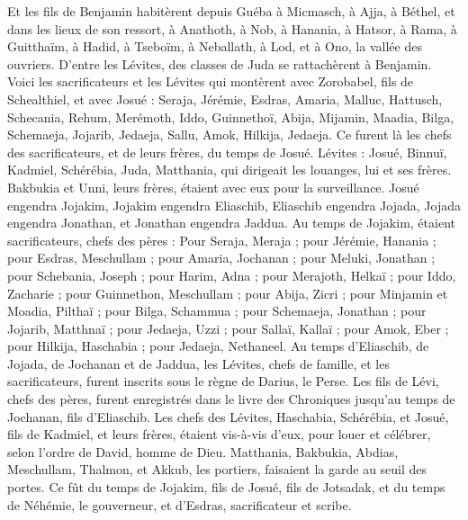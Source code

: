 \begin{multicols}{2}
Et les fils de Benjamin habitèrent depuis Guéba à Micmasch, à Ajja, à Béthel, et dans les lieux de son ressort,
à Anathoth, à Nob, à Hanania,
à Hatsor, à Rama, à Guitthaïm,
à Hadid, à Tseboïm, à Neballath,
à Lod, et à Ono, la vallée des ouvriers.
D'entre les Lévites, des classes de Juda se rattachèrent à Benjamin.
\VerseOne{}Voici les sacrificateurs et les Lévites qui montèrent avec Zorobabel, fils de Schealthiel, et avec Josué : Seraja, Jérémie, Esdras,
Amaria, Malluc, Hattusch,
Schecania, Rehum, Merémoth,
Iddo, Guinnethoï, Abija,
Mijamin, Maadia, Bilga,
Schemaeja, Jojarib, Jedaeja,
Sallu, Amok, Hilkija, Jedaeja. Ce furent là les chefs des sacrificateurs, et de leurs frères, du temps de Josué.
Lévites : Josué, Binnuï, Kadmiel, Schérébia, Juda,  Matthania, qui dirigeait les louanges, lui et ses frères.
Bakbukia et Unni, leurs frères, étaient avec eux pour la surveillance.
Josué engendra Jojakim, Jojakim engendra Eliaschib,  Eliaschib engendra Jojada,
Jojada engendra Jonathan, et Jonathan engendra Jaddua.
Au temps de Jojakim, étaient sacrificateurs, chefs des pères : Pour Seraja, Meraja ; pour Jérémie, Hanania ;
pour Esdras, Meschullam ; pour Amaria, Jochanan ;
pour Meluki, Jonathan ; pour Schebania, Joseph ;
pour Harim, Adna ; pour Merajoth, Helkaï ;
pour Iddo, Zacharie ; pour Guinnethon, Meschullam ;
pour Abija, Zicri ; pour Minjamin et Moadia, Pilthaï ;
pour Bilga, Schammua ; pour Schemaeja, Jonathan ;
pour Jojarib, Matthnaï ; pour Jedaeja, Uzzi ;
pour Sallaï, Kallaï ; pour Amok, Eber ;
pour Hilkija, Haschabia ; pour Jedaeja, Nethaneel.
Au temps d'Eliaschib, de Jojada, de Jochanan et de Jaddua, les Lévites, chefs de famille, et les sacrificateurs, furent inscrits sous le règne de Darius, le Perse.
Les fils de Lévi, chefs des pères, furent enregistrés dans le livre des Chroniques jusqu'au temps de Jochanan, fils d'Eliaschib.
Les chefs des Lévites, Haschabia, Schérébia, et Josué, fils de Kadmiel, et leurs frères, étaient vis-à-vis d'eux, pour louer et célébrer, selon l’ordre de David, homme de Dieu.
Matthania, Bakbukia, Abdias, Meschullam, Thalmon, et Akkub, les portiers, faisaient la garde au seuil des portes.
Ce fût du temps de Jojakim, fils de Josué, fils de Jotsadak, et du temps de Néhémie, le gouverneur, et d'Esdras, sacrificateur et scribe.

\end{multicols}
